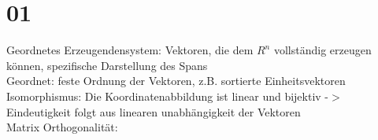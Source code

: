 \documentclass{article}
\begin{document}
\section{01}

Geordnetes Erzeugendensystem: Vektoren, die dem $R^n$ vollständig erzeugen können, spezifische Darstellung des Spans \\
Geordnet: feste Ordnung der Vektoren, z.B. sortierte Einheitsvektoren \\
Isomorphismus: Die Koordinatenabbildung ist linear und bijektiv -$>$ Eindeutigkeit folgt aus linearen unabhängigkeit der Vektoren\\
Matrix Orthogonalität: 
\end{document}
